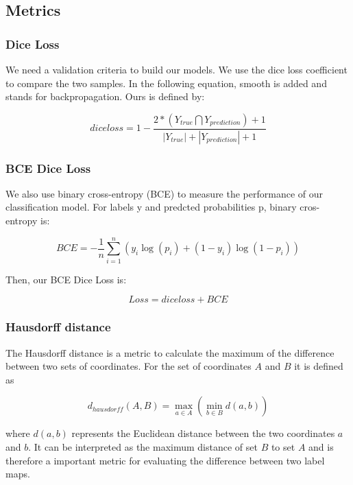 \subsection{Metrics}\label{metrics_chapter}

\subsubsection{Dice Loss}
We need a validation criteria to build our models. We use the dice loss coefficient to compare the two samples. In the following equation, smooth is added and stands for backpropagation. Ours is defined by: 

\begin{equation}
dice loss = 1 - \frac{2*(Y_{true} \bigcap Y_{prediction}) + 1}{|Y_{true}| + |Y_{prediction}| + 1}
\end{equation} 

\subsubsection{BCE Dice Loss}
We also use binary cross-entropy (BCE) to measure the performance of our classification model. For labels y and predcted probabilities p, binary cros-entropy is:

\begin{equation}
BCE = - \frac{1}{n} \sum_{i=1}^{n}(y_i \log{(p_i)} + (1-y_i)\log{(1-p_i)})
\end{equation} 


Then, our BCE Dice Loss is:

\begin{equation}
Loss =  dice loss + BCE
\end{equation}

\subsubsection{Hausdorff distance}
The Hausdorff distance is a metric to calculate the maximum of the difference between two sets of coordinates.\newline
For the set of coordinates $A$ and $B$ it is defined as

\begin{equation}
	d_{hausdorff} (A,B) = \max_{a \in A} (\min_{b \in B} d(a,b))
\end{equation} 

where $d(a,b)$ represents the Euclidean distance between the two coordinates $a$ and $b$. It can be interpreted as the maximum distance of set $B$ to set $A$ and is therefore a important metric for evaluating the difference between two label maps.

